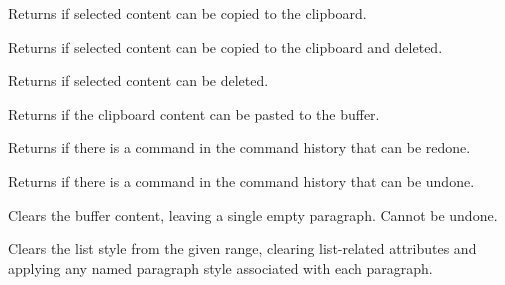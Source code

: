 \label{wxrichtextctrlcancopy}


Returns \true if selected content can be copied to the clipboard.

\label{wxrichtextctrlcancut}


Returns \true if selected content can be copied to the clipboard and deleted.

\label{wxrichtextctrlcandeleteselection}


Returns \true if selected content can be deleted.

\label{wxrichtextctrlcanpaste}


Returns \true if the clipboard content can be pasted to the buffer.

\label{wxrichtextctrlcanredo}


Returns \true if there is a command in the command history that can be redone.

\label{wxrichtextctrlcanundo}


Returns \true if there is a command in the command history that can be undone.

\label{wxrichtextctrlclear}


Clears the buffer content, leaving a single empty paragraph. Cannot be undone.

\label{wxrichtextctrlclearliststyle}



Clears the list style from the given range, clearing list-related attributes and applying any named paragraph style associated with each paragraph.


